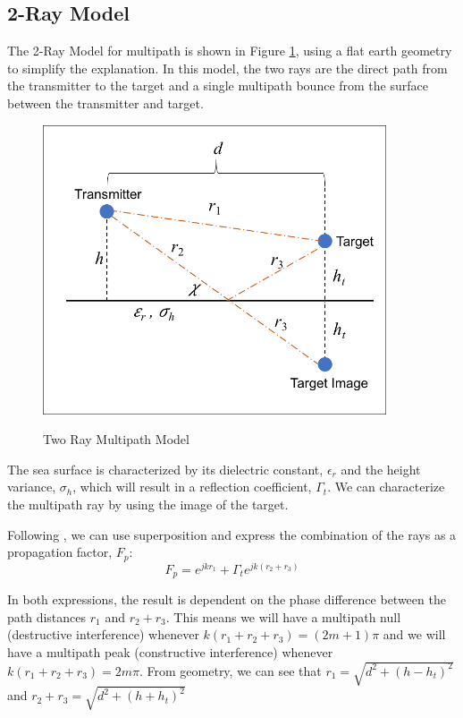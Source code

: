 \subsection{2-Ray Model}
The 2-Ray Model for multipath is shown in Figure \ref{env_fig:3}, using a flat earth geometry to simplify the explanation. In this model, the two rays are the direct path from the transmitter to the target and a single multipath bounce from the surface between the transmitter and target.
\begin{figure}[H]
  \begin{center}
\includegraphics[width=4in]{../media/multistatic/two_ray_multipath_model.png}
  \end{center}
  \renewcommand{\baselinestretch}{1} \small\normalsize
  \begin{quote}
    \caption[Two Ray Multipath Model]{Two Ray Multipath Model\label{env_fig:3}}
  \end{quote}
\end{figure}
\renewcommand{\baselinestretch}{2} \small\normalsize
The sea surface is characterized by its dielectric constant, $\epsilon_r$ and the height variance, $\sigma_h$, which will result in a reflection coefficient, $\Gamma_t$. We can characterize the multipath ray by using the image of the target.

Following \cite{lohrmann_rcs}, we can use superposition and express the combination of the rays as a propagation factor, $F_p$:
  \begin{equation}
  \label{env_eq:3b}
F_p = e^{jkr_1} + \Gamma_te^{jk\left(r_2 + r_3\right)}
\end{equation}

In both expressions, the result is dependent on the phase difference between the path distances $r_1$ and $r_2 + r_3$. This means we will have a multipath null (destructive interference) whenever $k\left(r_1 + r_2 + r_3\right) = (2m + 1)\pi$ and we will have a multipath peak (constructive interference) whenever $k\left(r_1 + r_2 + r_3\right) = 2m\pi$. From geometry, we can see that $r_1 = \sqrt{d^2 + (h-h_t)^2}$ and $r_2 + r_3 = \sqrt{d^2 + (h+h_t)^2}$


